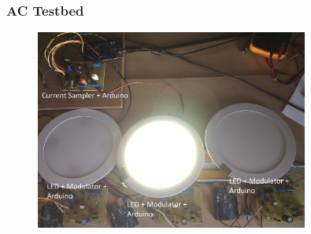 \documentclass{beamer}
\begin{document}

	\begin{frame}\frametitle{AC Testbed}
		
		\begin{figure}
			\centering
			\includegraphics[width=0.8\textwidth]{../chapters/hardware-chapters/AC/ac-test-bed/ac-test-bed-picture}
		\end{figure}

	\end{frame}
\end{document}
